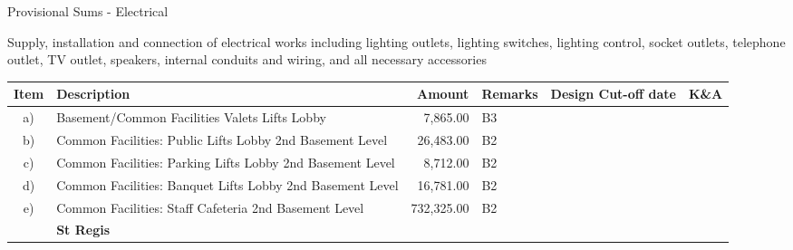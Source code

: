 Provisional Sums - Electrical
				
Supply, installation and connection of electrical works including lighting outlets, lighting switches, lighting control, socket outlets, telephone outlet, TV outlet, speakers, internal conduits and wiring, and all necessary accessories				

\newenvironment{pstable}{
\raggedright\small
\setcounter{step}{0}
\begin{longtable}{c>{\raggedright}p{3.4cm}rl p{2cm} p{3.5cm}}
\toprule
\textbf{Item}	& \textbf{Description}	 &\textbf{Amount}&\textbf{Remarks}	&\textbf{Design Cut-off date}
             	&\textbf{K\&A}\\
\midrule}{\bottomrule
\end{longtable}}

\begin{pstable}
a) &Basement/Common Facilities Valets Lifts Lobby 	 &7,865.00 	&B3		& & \ghot\\
b) &Common Facilities: Public Lifts Lobby 2nd Basement Level	 &26,483.00 	&B2	&	& \ghot \\
c) &Common Facilities: Parking Lifts Lobby 2nd Basement Level	 &8,712.00 	&B2		&& \ghot \\
d)	&Common Facilities: Banquet Lifts Lobby 2nd Basement Level	 &16,781.00 	&B2 &		& \ghot \\
e)	&Common Facilities: Staff Cafeteria 2nd Basement Level	 &732,325.00 	&B2	 &	& \ghot\\
   & \textbf{St Regis}                                              &              &     & &\\
\end{pstable}


